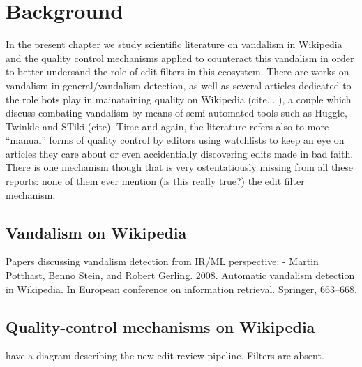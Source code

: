 \chapter{Background}
\label{chap:background}

In the present chapter we study scientific literature on vandalism in Wikipedia and the quality control mechanisms applied to counteract this vandalism in order to better undersand the role of edit filters in this ecosystem.
There are works on vandalism in general/vandalism detection, as well as several articles dedicated to the role bots play in mainataining quality on Wikipedia (cite... ), a couple which discuss combating vandalism by means of semi-automated tools such as Huggle, Twinkle and STiki (cite).
Time and again, the literature refers also to more ``manual'' forms of quality control by editors using watchlists to keep an eye on articles they care about or even accidentially discovering edits made in bad faith.
There is one mechanism though that is very ostentatiously missing from all these reports: none of them ever mention (is this really true?) the edit filter mechanism.

\section{Vandalism on Wikipedia}

Papers discussing vandalism detection from IR/ML perspective:
- Martin Potthast, Benno Stein, and Robert Gerling. 2008. Automatic vandalism detection in Wikipedia. In European conference on information retrieval. Springer, 663–668.

\section{Quality-control mechanisms on Wikipedia}

\cite{AstHal2018} have a diagram describing the new edit review pipeline. Filters are absent.

